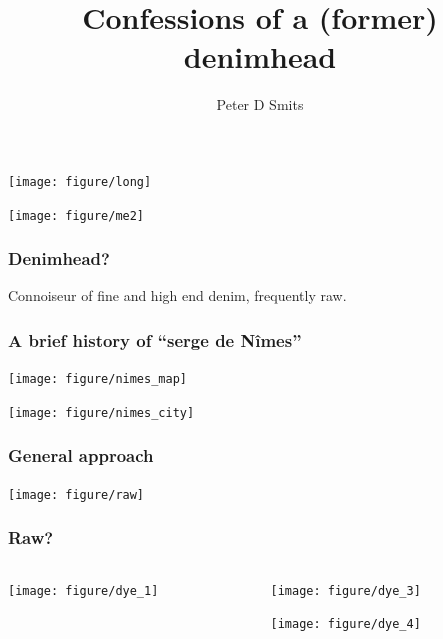 \documentclass{beamer}
\title{Confessions of a (former) denimhead}
\author{Peter D Smits}
\institute{Committee on Evolutionary Biology, University of Chicago}
\date{}
\begin{document}
\begin{frame}
  \maketitle
\end{frame}

\begin{frame}
  \texttt{[image: figure/long]}
\end{frame}

\begin{frame}
  \texttt{[image: figure/me2]}
\end{frame}

\begin{frame}
  \frametitle{Denimhead?}

  Connoiseur of fine and high end denim, frequently raw.
\end{frame}

\begin{frame}
  \frametitle{A brief history of ``serge de N\^{i}mes''}

  \begin{center}
    \texttt{[image: figure/nimes\_map]}

    \texttt{[image: figure/nimes\_city]}
  \end{center}
\end{frame}

\begin{frame}
  \frametitle{General approach}

  \begin{center}
    \texttt{[image: figure/raw]}
  \end{center}
\end{frame}

\begin{frame}
  \frametitle{Raw?}
  \begin{columns}
    \begin{column}{0.5\textwidth}
      \texttt{[image: figure/dye\_1]}
    \end{column}
    \begin{column}{0.5\textwidth}
      \texttt{[image: figure/dye\_3]}
      
      \texttt{[image: figure/dye\_4]}
    \end{column}
  \end{columns}
\end{frame}
\end{document}
